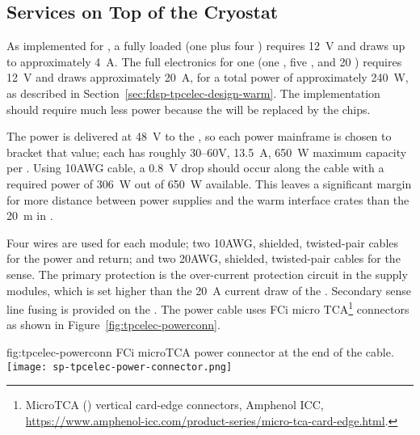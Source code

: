\subsection{Services on Top of the Cryostat}
\label{sec:fdsp-tpcelec-design-services}

As implemented for , a fully loaded  (one  plus four ) requires
\SI{12}{V} and draws up to approximately \SI{4}{A}. The full electronics for one  (one , five , and \num{20} ) 
requires \SI{12}{V} and draws approximately \SI{20}{A}, for a total power of approximately \SI{240}{W}, as 
described in Section~\ref{sec:fdsp-tpcelec-design-warm}. The  implementation should require much 
less power because the  will be replaced by the  chips.

The  power is delivered at \SI{48}{V} to the , so each  power mainframe is chosen to bracket that value; each has  
roughly \numrange{30}{60}{V}, \SI{13.5}{A}, \SI{650}{W} maximum capacity per . Using 10AWG cable, a \SI{0.8}{V} drop should occur along the cable with a required power of \SI{306}{W} out of \SI{650}{W} available.  
This leaves a significant margin for more distance between power supplies and 
the warm interface crates than the \SI{20}{\meter} in .

Four wires are used for each module; two 10AWG, shielded, twisted-pair cables for the power and return; and two 20AWG, shielded, twisted-pair cables for the sense.
The primary protection is the over-current protection circuit in the  supply modules, 
which is set higher than the \SI{20}{A} current draw of the .  Secondary sense line fusing is 
provided on the .  The  power cable uses FCi micro TCA\footnote{MicroTCA\texttrademark{} () vertical card-edge connectors, Amphenol ICC,  \url{https://www.amphenol-icc.com/product-series/micro-tca-card-edge.html}.} connectors as shown in
Figure~\ref{fig:tpcelec-powerconn}.

\begin{dunefigure}
{fig:tpcelec-powerconn}
{FCi microTCA power connector at the  end of the cable.}
\texttt{[image: sp-tpcelec-power-connector.png]}
\end{dunefigure}

